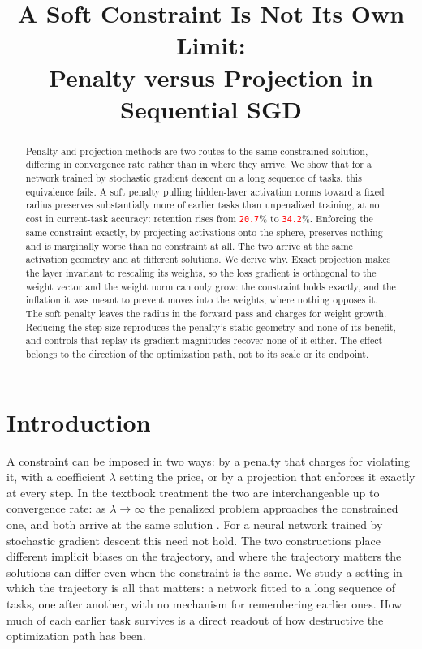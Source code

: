 \documentclass[anon]{opt2026}     %
\title[A Soft Constraint Is Not Its Own Limit]{%
  A Soft Constraint Is Not Its Own Limit:\\
  Penalty versus Projection in Sequential SGD}
\newcommand{\PH}[1]{\textcolor{red}{\texttt{#1}}}   %
\begin{document}
\maketitle

\begin{abstract}%
Penalty and projection methods are two routes to the same constrained solution,
differing in convergence rate rather than in where they arrive. We show that for
a network trained by stochastic gradient descent on a long sequence of tasks,
this equivalence fails. A soft penalty pulling hidden-layer activation norms
toward a fixed radius preserves substantially more of earlier tasks than
unpenalized training, at no cost in current-task accuracy: retention rises from
\PH{20.7}\% to \PH{34.2}\%. Enforcing the same constraint exactly, by projecting
activations onto the sphere, preserves nothing and is marginally worse than no
constraint at all. The two arrive at the same activation geometry and at
different solutions. We derive why. Exact projection makes the layer invariant to
rescaling its weights, so the loss gradient is orthogonal to the weight vector
and the weight norm can only grow: the constraint holds exactly, and the
inflation it was meant to prevent moves into the weights, where nothing opposes
it. The soft penalty leaves the radius in the forward pass and charges for
weight growth. Reducing the step size reproduces the penalty's static geometry
and none of its benefit, and controls that replay its gradient magnitudes
recover none of it either. The effect belongs to the direction of the
optimization path, not to its scale or its endpoint.
\end{abstract}

\section{Introduction}
\label{sec:intro}

A constraint can be imposed in two ways: by a penalty that charges for
violating it, with a coefficient $\lambda$ setting the price, or by a projection
that enforces it exactly at every step. In the textbook treatment the two are
interchangeable up to convergence rate: as $\lambda \to \infty$ the penalized
problem approaches the constrained one, and both arrive at the same solution
\citep{nocedal2006numerical}. For a neural network trained by stochastic
gradient descent this need not hold. The two constructions place different
implicit biases on the trajectory, and where the trajectory matters the
solutions can differ even when the constraint is the same. We study a setting in
which the trajectory is all that matters: a network fitted to a long sequence of
tasks, one after another, with no mechanism for remembering earlier ones. How
much of each earlier task survives is a direct readout of how destructive the
optimization path has been.
\end{document}
